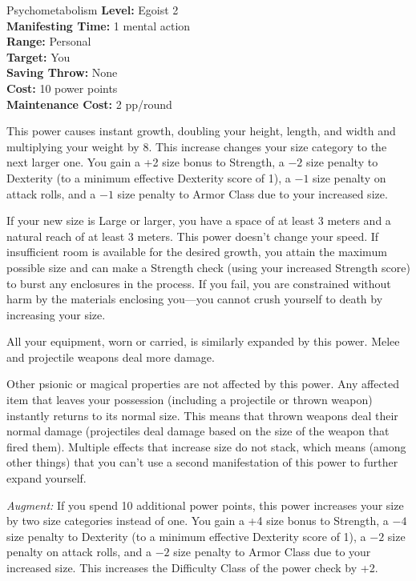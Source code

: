 {Psychometabolism}
{
	\textbf{Level:}
	Egoist 2\\
	\textbf{Manifesting Time:}
	1 mental action\\
	\textbf{Range:}
	Personal\\
	\textbf{Target:}
	You\\
	\textbf{Saving Throw:}
	None\\
	\textbf{Cost:}
	10 power points\\
	\textbf{Maintenance Cost:}
	2 pp/round\\
}
{
	This power causes instant growth, doubling your height, length, and width and multiplying your weight by 8. This increase changes your size category to the next larger one. You gain a +2 size bonus to Strength, a $-2$ size penalty to Dexterity (to a minimum effective Dexterity score of 1), a $-1$ size penalty on attack rolls, and a $-1$ size penalty to Armor Class due to your increased size.

	If your new size is Large or larger, you have a space of at least 3 meters and a natural reach of at least 3 meters. This power doesn't change your speed. If insufficient room is available for the desired growth, you attain the maximum possible size and can make a Strength check (using your increased Strength score) to burst any enclosures in the process. If you fail, you are constrained without harm by the materials enclosing you—you cannot crush yourself to death by increasing your size.

	All your equipment, worn or carried, is similarly expanded by this power. Melee and projectile weapons deal more damage.

	Other psionic or magical properties are not affected by this power. Any affected item that leaves your possession (including a projectile or thrown weapon) instantly returns to its normal size. This means that thrown weapons deal their normal damage (projectiles deal damage based on the size of the weapon that fired them). Multiple effects that increase size do not stack, which means (among other things) that you can't use a second manifestation of this power to further expand yourself.

	\textit{Augment:} If you spend 10 additional power points, this power increases your size by two size categories instead of one. You gain a +4 size bonus to Strength, a $-4$ size penalty to Dexterity (to a minimum effective Dexterity score of 1), a $-2$ size penalty on attack rolls, and a $-2$ size penalty to Armor Class due to your increased size. This increases the Difficulty Class of the power check by +2.
}